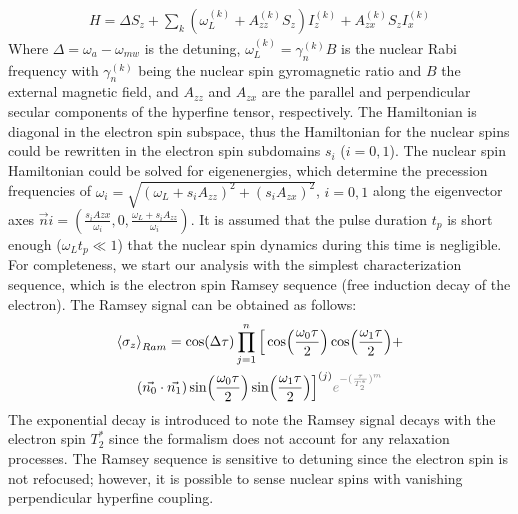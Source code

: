 \documentclass[%
 reprint,
superscriptaddress,
 amsmath,amssymb,
 aps,
]{revtex4-2}
\begin{document}
\begin{align}
	H = \Delta S_z + \sum_k (\omega_L^{(k)}  + A_{zz}^{(k)} S_z) I_z^{(k)} + A_{zx}^{(k)} S_z I_x^{(k)}
	\label{eq:H}
\end{align}
Where $\Delta = \omega_a - \omega_{mw}$ is the detuning, $\omega_L^{(k)} =\gamma_n^{(k)} B$ is the nuclear Rabi frequency with $\gamma_n^{(k)}$ being the nuclear spin gyromagnetic ratio and $B$ the external magnetic field, and $A_{zz}$ and $A_{zx}$ are the parallel and perpendicular secular components of the hyperfine tensor, respectively.
The Hamiltonian is diagonal in the electron spin subspace, thus the Hamiltonian for the nuclear spins could be rewritten in the electron spin subdomains $s_i$ ($i=0,1$).
The nuclear spin Hamiltonian could be solved for eigenenergies, which determine the precession frequencies of $\omega_i = \sqrt{(\omega_L + s_i A_{zz})^2+ (s_i A_{zx})^2}$, $i=0,1$ along the eigenvector axes $\vec{n}i =(\frac{s_i A{zx}}{\omega_i}, 0, \frac{\omega_L + s_i A_{zz}} {\omega_i})$.
It is assumed that the pulse duration $t_p$ is short enough ($\omega_L t_p \ll 1$) that the nuclear spin dynamics during this time is negligible.
For completeness, we start our analysis with the simplest characterization sequence, which is the electron spin Ramsey sequence (free induction decay of the electron).
The Ramsey signal can be obtained as follows:
\begin{gather}
	\expval{\sigma_z}_{Ram} = \cos(\Delta \tau) \prod_{j=1}^{n} \Big[ \cos(\frac{\omega_0 \tau}{2}) \cos(\frac{\omega_1 \tau}{2})+ \notag \\
	(\vec{n_0}\cdot \vec{n_1})\sin(\frac{\omega_0 \tau}{2}) \sin(\frac{\omega_1 \tau}{2}) \Big]^{(j)}
	\textcolor{gray}{e^{-(\frac{\tau}{T_2^\ast})^m}}
\end{gather}	
The exponential decay is introduced to note the Ramsey signal decays with the electron spin $T_2^\ast$ since the formalism does not account for any relaxation processes. The Ramsey sequence is sensitive to detuning since the electron spin is not refocused; however, it is possible to sense nuclear spins with vanishing perpendicular hyperfine coupling.\\
\end{document}

